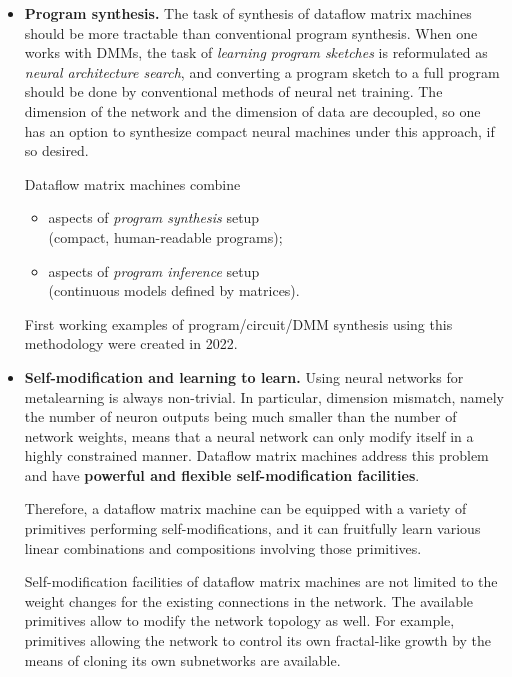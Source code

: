 \documentclass{article}
\begin{document}
\begin{itemize}

  \item {\bf Program synthesis.} The task of synthesis of dataflow matrix machines
should be more tractable than conventional program synthesis. When one works with DMMs, the task of
{\em learning program sketches} is reformulated as {\em neural architecture search},
and converting a program sketch to a full program should be done by
conventional methods of neural net training. The dimension of the network and the dimension
of data are decoupled, so one has an option to synthesize compact neural machines
under this approach, if so desired.

\vspace{0.1in}
Dataflow matrix machines combine

  \begin{itemize}
      \item aspects of {\em program synthesis} setup\\ (compact, human-readable programs);
      \item aspects of {\em program inference} setup\\ (continuous models defined by matrices).
  \end{itemize}

First working examples of program/circuit/DMM synthesis using this methodology were created in 2022.

\vspace{0.1in}
\item {\bf Self-modification and learning to learn.} Using neural networks for metalearning
is always non-trivial. In particular, dimension mismatch, namely the number of neuron outputs 
being much smaller than the number of network weights,
means that a neural network
can only modify itself in a highly constrained manner. Dataflow matrix machines address
this problem and have {\bf powerful and flexible self-modification facilities}.

\vspace{0.1in}
Therefore, a dataflow matrix machine can be equipped with a variety of primitives
performing self-modifications, and it can fruitfully learn various linear combinations and
compositions involving those primitives.

\vspace{0.1in}
Self-modification facilities of dataflow matrix machines are not limited to the weight
changes for the existing connections in the network. The available primitives allow to
modify the network topology as well. For example, primitives allowing the network
to control its own fractal-like growth by the means of cloning its own subnetworks
are available.


\end{itemize}
\end{document}
